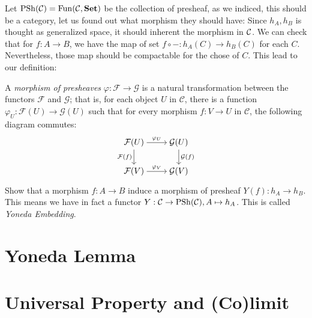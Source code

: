 Let $\mathrm{PSh}(\mathcal{C})=\mathrm{Fun}(\mathcal{C},\mathbf{Set})$ be the collection of presheaf, as we indiced, this should be a category, let us found out what morphism they should have: Since $h_A,h_B$ is thought as generalized space, it should inherent the morphism in $\mathcal{C}$. We can check that for $f:A\to B$, we have the map of set $ f\circ -: h_A(C)\to h_B(C)$ for each $C$. Nevertheless, those map should be compactable for the chose of $C$. This lead to our definition:
\begin{definition}
  
A \emph{morphism of presheaves} $\varphi : \mathcal{F} \to \mathcal{G}$ is a natural transformation between the functors $\mathcal{F}$ and $\mathcal{G}$; that is, for each object $U$ in $\mathcal{C}$, there is a function $\varphi_U : \mathcal{F}(U) \to \mathcal{G}(U)$ such that for every morphism $f : V \to U$ in $\mathcal{C}$, the following diagram commutes:
\[\begin{tikzcd}[ampersand replacement=\&,cramped]
  \mathcal{F}(U) \&  \mathcal{G}(U) \\
\mathcal{F}(V)   \& \mathcal{G}(V)
	\arrow["{\varphi_U}", from=1-1, to=1-2]
	\arrow["{\mathcal{F}(f)}"', from=1-1, to=2-1]
	\arrow["{\mathcal{G}(f)}", from=1-2, to=2-2]
	\arrow["{\varphi_V}", from=2-1, to=2-2]
\end{tikzcd}\]

\end{definition}
\begin{exercise}
  Show that a morphism $f:A\to B$ induce a morphism of presheaf $Y(f):h_A\to h_B$. This means we have in fact a functor $ Y: \mathcal{C} \to \mathrm{PSh}(\mathcal{C}), A\mapsto h_A $. This is called \emph{Yoneda Embedding}.
\end{exercise}
\section{Yoneda Lemma}

\section{Universal Property and (Co)limit}
